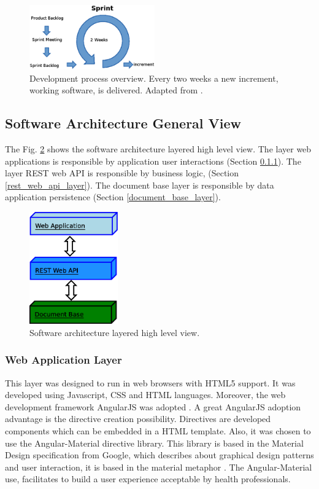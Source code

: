 \documentclass[journal]{IEEEtran}
\begin{document}
\begin{figure}[!t]
	\centering
	\includegraphics[width=0.48\textwidth]{./dev_proc.eps}
	\caption{Development process overview.
		Every two weeks a new increment, working software, is delivered.
		Adapted from \cite{Schwaber2004}.
	}
	\label{dev_proc}
\end{figure}

\subsection{Software Architecture General View}
The Fig. \ref{app_layers} shows the software architecture layered high level view.
The layer web applications is responsible by application user interactions (Section \ref{web_application_layer}).
The layer REST web API is responsible by business logic, (Section \ref{rest_web_api_layer}).
The document base layer is responsible by data application persistence (Section \ref{document_base_layer}).
\begin{figure}[!t]
	\centering
	\includegraphics[width=1.5in]{./app_layers.eps}
	\caption{Software architecture layered high level view.
	}
	\label{app_layers}
\end{figure}

\subsubsection{Web Application Layer}
\label{web_application_layer}

This layer was designed to run in web browsers with HTML5 support.
It was developed using Javascript, CSS and HTML languages. 
Moreover, the web development framework AngularJS was adopted \cite{Branas2014,Freeman2014}. 
A great AngularJS adoption advantage is the directive creation possibility. 
Directives are developed components which can be embedded in a HTML template.
Also, it was chosen to use the Angular-Material directive library. 
This library is based in the Material Design specification from Google, which
describes about graphical design patterns and user interaction, it is based in the material metaphor
\cite{Google2015a}. The Angular-Material use, facilitates to build a user experience acceptable by 
health professionals.
\end{document}
